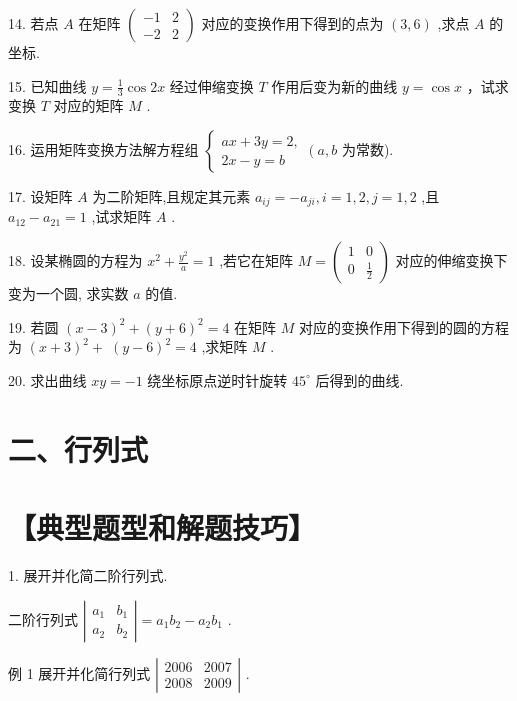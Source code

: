 \documentclass[10pt]{article}
\begin{document}
14. 若点 \(A\) 在矩阵 \(\left( \begin{array}{ll}  - 1 & 2 \\   - 2 & 2 \end{array}\right)\) 对应的变换作用下得到的点为 \(\left( {3,6}\right)\) ,求点 \(A\) 的坐标.

15. 已知曲线 \(y = \frac{1}{3}\cos {2x}\) 经过伸缩变换 \(T\) 作用后变为新的曲线 \(y = \cos x\) ，试求变换 \(T\) 对应的矩阵 \(M\) .

16. 运用矩阵变换方法解方程组 \(\left\{  {\begin{array}{l} {ax} + {3y} = 2, \\  {2x} - y = b \end{array}\left( {a,b}\right. }\right.\) 为常数).

17. 设矩阵 \(A\) 为二阶矩阵,且规定其元素 \({a}_{ij} =  - {a}_{ji},i = 1,2,j = 1,2\) ,且 \({a}_{12} - {a}_{21} = 1\) ,试求矩阵 \(A\) .

18. 设某椭圆的方程为 \({x}^{2} + \frac{{y}^{2}}{a} = 1\) ,若它在矩阵 \(M = \left( \begin{matrix} 1 & 0 \\  0 & \frac{1}{2} \end{matrix}\right)\) 对应的伸缩变换下变为一个圆, 求实数 \(a\) 的值.

19. 若圆 \({\left( x - 3\right) }^{2} + {\left( y + 6\right) }^{2} = 4\) 在矩阵 \(M\) 对应的变换作用下得到的圆的方程为 \({\left( x + 3\right) }^{2} + \; {\left( y - 6\right) }^{2} = 4\) ,求矩阵 \(M\) .

20. 求出曲线 \({xy} =  - 1\) 绕坐标原点逆时针旋转 \({45}^{ \circ  }\) 后得到的曲线.

\section*{二、行列式}

\section*{【典型题型和解题技巧】}

1. 展开并化简二阶行列式.

二阶行列式 \(\left| \begin{array}{ll} {a}_{1} & {b}_{1} \\  {a}_{2} & {b}_{2} \end{array}\right|  = {a}_{1}{b}_{2} - {a}_{2}{b}_{1}\) .

例 1 展开并化简行列式 \(\left| \begin{array}{ll} {2006} & {2007} \\  {2008} & {2009} \end{array}\right|\) .
\end{document}
